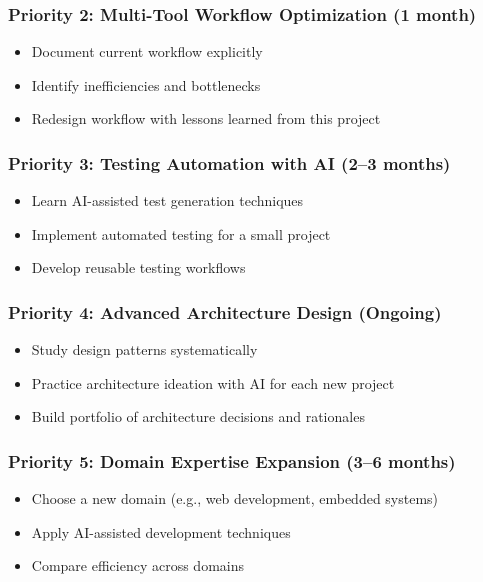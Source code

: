 \documentclass[12pt,a4paper]{article}
\begin{document}
\subsubsection*{Priority 2: Multi-Tool Workflow Optimization (1 month)}
\begin{itemize}
    \item Document current workflow explicitly
    \item Identify inefficiencies and bottlenecks
    \item Redesign workflow with lessons learned from this project
\end{itemize}

\subsubsection*{Priority 3: Testing Automation with AI (2--3 months)}
\begin{itemize}
    \item Learn AI-assisted test generation techniques
    \item Implement automated testing for a small project
    \item Develop reusable testing workflows
\end{itemize}

\subsubsection*{Priority 4: Advanced Architecture Design (Ongoing)}
\begin{itemize}
    \item Study design patterns systematically
    \item Practice architecture ideation with AI for each new project
    \item Build portfolio of architecture decisions and rationales
\end{itemize}

\subsubsection*{Priority 5: Domain Expertise Expansion (3--6 months)}
\begin{itemize}
    \item Choose a new domain (e.g., web development, embedded systems)
    \item Apply AI-assisted development techniques
    \item Compare efficiency across domains
\end{itemize}
\end{document}
